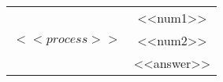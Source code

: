 \begin{tabular}{c S[table-format=<<numip>>.<<numdp>>]}
     &<<num1>> \tabularnewline
    $<<process>>$&<<num2>> \tabularnewline
    \hline
     &<<answer>> \tabularnewline
    \hline
\end{tabular}
